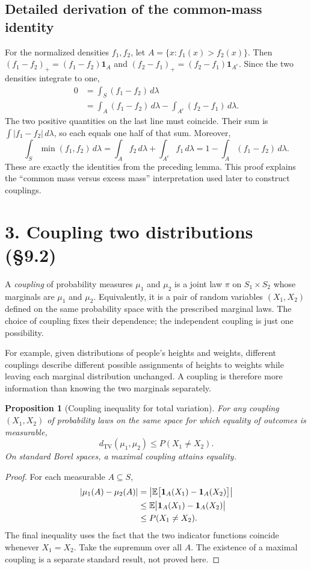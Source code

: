 \documentclass[10pt,a4paper]{article}
\newtheorem{proposition}{Proposition}
\newcommand{\TV}{d_{\mathrm{TV}}}
\begin{document}
\subsection*{Detailed derivation of the common-mass identity}
For the normalized densities $f_1,f_2$, let $A=\{x:f_1(x)>f_2(x)\}$. Then $(f_1-f_2)_+=(f_1-f_2)\mathbf1_A$ and $(f_2-f_1)_+=(f_2-f_1)\mathbf1_{A^c}$. Since the two densities integrate to one,
\begin{align*}
0&=\int_S(f_1-f_2)\,d\lambda\\
 &=\int_A(f_1-f_2)\,d\lambda
   -\int_{A^c}(f_2-f_1)\,d\lambda.
\end{align*}
The two positive quantities on the last line must coincide. Their sum is $\int|f_1-f_2|\,d\lambda$, so each equals one half of that sum. Moreover,
\[
\int_S\min(f_1,f_2)\,d\lambda
=\int_A f_2\,d\lambda+\int_{A^c}f_1\,d\lambda
=1-\int_A(f_1-f_2)\,d\lambda.
\]
These are exactly the identities from the preceding lemma. This proof explains the ``common mass versus excess mass'' interpretation used later to construct couplings.

\section*{3. Coupling two distributions (\S9.2)}
A \emph{coupling} of probability measures $\mu_1$ and $\mu_2$ is a joint law $\pi$ on $S_1\times S_2$ whose marginals are $\mu_1$ and $\mu_2$. Equivalently, it is a pair of random variables $(X_1,X_2)$ defined on the same probability space with the prescribed marginal laws. The choice of coupling fixes their dependence; the independent coupling is just one possibility.

For example, given distributions of people's heights and weights, different couplings describe different possible assignments of heights to weights while leaving each marginal distribution unchanged. A coupling is therefore more information than knowing the two marginals separately.

\begin{proposition}[Coupling inequality for total variation]
For any coupling $(X_1,X_2)$ of probability laws on the same space for which equality of outcomes is measurable,
\[
\TV(\mu_1,\mu_2)\le P(X_1\ne X_2).
\]
On standard Borel spaces, a \emph{maximal coupling} attains equality.
\end{proposition}
\begin{proof}
For each measurable $A\subseteq S$,
\begin{align*}
|\mu_1(A)-\mu_2(A)|
&=\left|\mathbb E\bigl[\mathbf1_A(X_1)-\mathbf1_A(X_2)\bigr]\right|\\
&\le\mathbb E\bigl|\mathbf1_A(X_1)-\mathbf1_A(X_2)\bigr|\\
&\le P(X_1\ne X_2).
\end{align*}
The final inequality uses the fact that the two indicator functions coincide whenever $X_1=X_2$. Take the supremum over all $A$. The existence of a maximal coupling is a separate standard result, not proved here.
\end{proof}
\end{document}
